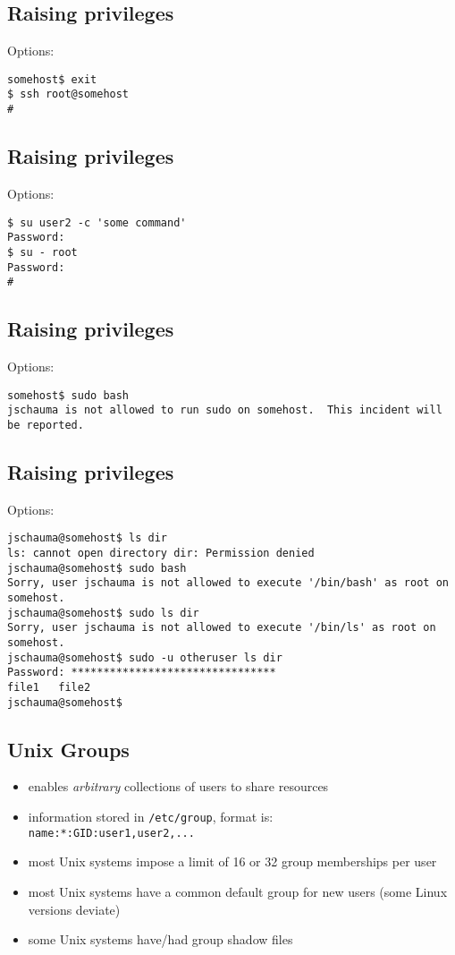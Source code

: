 \documentclass[xga]{xdvislides}
\begin{document}
\subsection{Raising privileges}
Options:

\begin{verbatim}
somehost$ exit
$ ssh root@somehost
# 
\end{verbatim}

\subsection{Raising privileges}
Options:

\begin{verbatim}
$ su user2 -c 'some command'
Password:
$ su - root
Password:
# 
\end{verbatim}

\subsection{Raising privileges}
Options:

\begin{verbatim}
somehost$ sudo bash
jschauma is not allowed to run sudo on somehost.  This incident will be reported.
\end{verbatim}

\subsection{Raising privileges}
Options:

\begin{verbatim}
jschauma@somehost$ ls dir
ls: cannot open directory dir: Permission denied
jschauma@somehost$ sudo bash
Sorry, user jschauma is not allowed to execute '/bin/bash' as root on somehost.
jschauma@somehost$ sudo ls dir
Sorry, user jschauma is not allowed to execute '/bin/ls' as root on somehost.
jschauma@somehost$ sudo -u otheruser ls dir
Password: ********************************
file1   file2
jschauma@somehost$ 
\end{verbatim}

\subsection{Unix Groups}
\begin{itemize}
	\item enables {\em arbitrary} collections of users to share resources
	\item information stored in \verb+/etc/group+, format is: \\
		\verb+name:*:GID:user1,user2,...+
	\item most Unix systems impose a limit of 16 or 32 group memberships per
		user
	\item most Unix systems have a common default group for new users (some
		Linux versions deviate)
	\item some Unix systems have/had group shadow files
\end{itemize}
\end{document}
